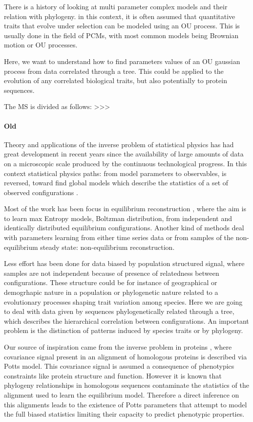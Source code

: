 \documentclass[preprint,amsmath,amssymb,superscriptaddress,showpacs,pre]{revtex4-1}
\begin{document}
There is a history of looking at multi parameter complex models and their relation with phylogeny. 
in this context, it is often assumed that quantitative traits that evolve under selection can be modeled using an OU process. 
This is usually done in the field of PCMs, with most common models being Brownian motion or OU processes. 

Here, we want to understand how to find parameters values of an OU gaussian process from data correlated through a tree. 
This could be applied to the evolution of any correlated biological traits, but also potentially to protein sequences. 

The MS is divided as follows: >>> 


\paragraph{Old} %
\label{par:old}

Theory and applications of the inverse problem of statistical physics has had great development in recent years since the availability of large amounts of data on a microscopic scale produced by the continuous technological progress. In this context statistical physics paths: from model parameters to  observables, is reversed, toward find global models which describe the statistics of  a set of observed  configurations \cite{Inverse_problem_Berg}. 

Most of the work has been focus in equilibrium reconstruction , where the aim is to learn max Entropy models, Boltzman distribution, from independent and identically distributed equilibrium configurations. Another kind of methods deal with parameters learning from either time series data or from samples of the non-equilibrium steady state: non-equilibrium reconstruction.

Less effort has been done for data biased by population structured signal, where  samples  are not independent because of presence of relatedness between configurations. These structure could be for instance of  geographical or demogrhapic  nature in a population or  phylogenetic  nature  related to a evolutionary processes shaping trait variation among species.  Here we are going to deal with data given by sequences phylogenetically related  through a tree, which describes the hierarchical correlation between configurations. An important problem is the  distinction   of patterns induced by species traits or by phylogeny. 

Our source of inspiration came from the inverse problem in proteins \cite{Inverse_problem_proteins}, where  covariance signal present in an alignment of homologous proteins is described via Potts model. This covariance signal is assumed a consequence of phenotypics constraints like protein structure and function. However it is known that phylogeny relationships in homologous sequences  contaminate the statistics of  the alignment used to learn the equilibrium model. Therefore a direct inference on this alignments  leads to the existence of Potts parameters that attempt to model the full biased statistics limiting their capacity to predict phenotypic properties.
\end{document}
